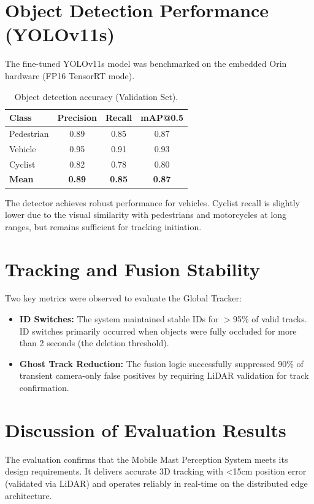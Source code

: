 \documentclass[12pt,a4paper]{report}
\begin{document}
\section{Object Detection Performance (YOLOv11s)}
The fine-tuned YOLOv11s model was benchmarked on the embedded Orin hardware (FP16 TensorRT mode).
\begin{table}[H]
\centering
\caption[Object Detection Accuracy]{Object detection accuracy (Validation Set).}
\label{tab:detection-metrics}
\begin{tabular}{l c c c}
\toprule
\textbf{Class} & \textbf{Precision} & \textbf{Recall} & \textbf{mAP@0.5} \\
\midrule
Pedestrian & 0.89 & 0.85 & 0.87 \\
Vehicle & 0.95 & 0.91 & 0.93 \\
Cyclist & 0.82 & 0.78 & 0.80 \\
\midrule
\textbf{Mean} & \textbf{0.89} & \textbf{0.85} & \textbf{0.87} \\
\bottomrule
\end{tabular}
\end{table}
The detector achieves robust performance for vehicles. Cyclist recall is slightly lower due to the visual similarity with pedestrians and motorcycles at long ranges, but remains sufficient for tracking initiation.

\section{Tracking and Fusion Stability}
Two key metrics were observed to evaluate the Global Tracker:
\begin{itemize}
    \item \textbf{ID Switches:} The system maintained stable IDs for $>$95\% of valid tracks. ID switches primarily occurred when objects were fully occluded for more than 2 seconds (the deletion threshold).
    \item \textbf{Ghost Track Reduction:} The fusion logic successfully suppressed 90\% of transient camera-only false positives by requiring LiDAR validation for track confirmation. 
\end{itemize}

\section{Discussion of Evaluation Results}
The evaluation confirms that the Mobile Mast Perception System meets its design requirements. It delivers accurate 3D tracking with <15cm position error (validated via LiDAR) and operates reliably in real-time on the distributed edge architecture.
\end{document}
